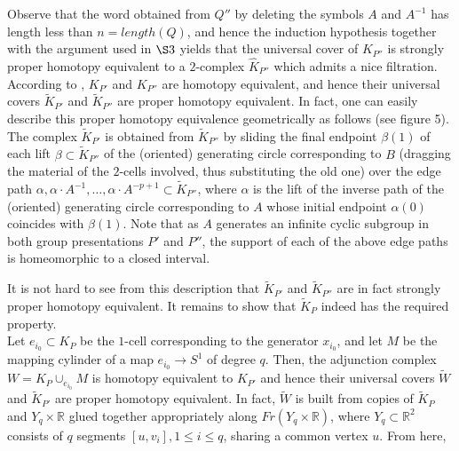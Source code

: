 \documentclass{amsart}[12pt]
\theoremstyle{definition}
\theoremstyle{remark}
\numberwithin{equation}{section}
\begin{document}
Observe that the word obtained from $Q''$ by deleting the symbols
$A$ and $A^{-1}$ has length less than $n=length(Q)$, and hence the
induction hypothesis together with the argument used in $\S 3$
yields that the universal cover of $K_{P''}$ is strongly proper
homotopy equivalent to a $2$-complex $\widehat{K}_{P''}$ which
admits a nice filtration. According to \cite{DV}, $K_{P'}$ and
$K_{P''}$ are homotopy equivalent, and hence their universal
covers $\widetilde{K}_{P'}$ and $\widetilde{K}_{P''}$ are proper
homotopy equivalent. In fact, one can easily describe this proper
homotopy equivalence geo\-metrically as follows (see figure 5).
The complex $\widetilde{K}_{P'}$ is obtained from
$\widetilde{K}_{P''}$ by sliding the final endpoint $\beta(1)$ of
each lift $\beta {\subset} \widetilde{K}_{P''}$ of the (oriented)
generating circle corresponding to $B$ (dragging the material of
the $2$-cells involved, thus substituting the old one) over the
edge path $\alpha, \alpha \cdot A^{-1}, \dots, \alpha \cdot
A^{-p+1} {\subset} \widetilde{K}_{P''}$, where $\alpha$ is the lift of
the inverse path of the (oriented) generating circle corresponding
to $A$ whose initial endpoint $\alpha(0)$ coincides with
$\beta(1)$. Note that as $A$ generates an infinite cyclic subgroup
in both group presentations $P'$ and $P''$, the support of each of
the above edge paths is homeomorphic to a closed interval.
\begin{figure}
\centerline{}
\label{figure5} \caption{}
\end{figure}
It is not hard to see from this description that
$\widetilde{K}_{P'}$ and $\widetilde{K}_{P''}$ are in fact
strongly proper homotopy equivalent. It
remains to show that $\widetilde{K}_P$ indeed has the required property.\\
\indent Let $e_{i_0} {\subset} K_P$ be the $1$-cell corresponding to
the generator $x_{i_0}$, and let $M$ be the mapping cylinder of a
map $e_{i_0} {\longrightarrow} S^1$ of degree $q$. Then, the adjunction complex
$W= K_P \cup_{e_{i_0}} M$ is homotopy equivalent to $K_{P'}$ and
hence their universal co\-vers $\widetilde{W}$ and
$\widetilde{K}_{P'}$ are proper homotopy equivalent. In fact,
$\widetilde{W}$ is built from copies of $\widetilde{K}_P$ and $Y_q
\times {\mathbb R}$ glued together appropriately along $Fr (Y_q \times
{\mathbb R})$, where $Y_q {\subset} {\mathbb R}^2$ consists of $q$ segments $[u,
v_i], 1 \leq i \leq q$, sharing a common vertex $u$. From here,
\end{document}
